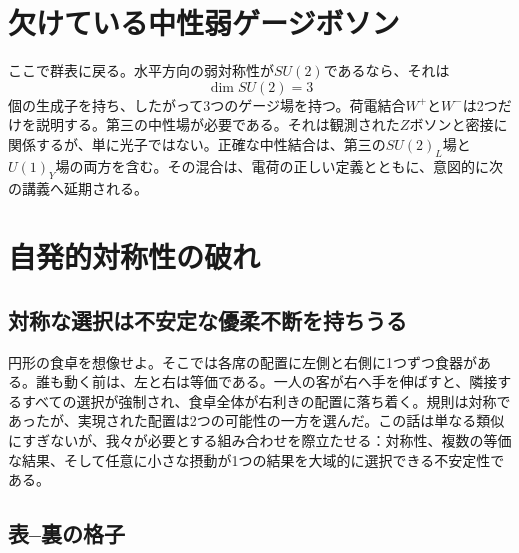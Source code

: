 \begin{classroomqa}
\end{classroomqa}

\section{欠けている中性弱ゲージボソン}

ここで群表に戻る。水平方向の弱対称性が\(SU(2)\)であるなら、それは
\begin{equation}
  \dim SU(2)=3
\end{equation}
個の生成子を持ち、したがって3つのゲージ場を持つ。荷電結合\(W^+\)と\(W^-\)は2つだけを説明する。第三の中性場が必要である。それは観測された\(Z\)ボソンと密接に関係するが、単に光子ではない。正確な中性結合は、第三の\(SU(2)_L\)場と\(U(1)_Y\)場の両方を含む。その混合は、電荷の正しい定義とともに、意図的に次の講義へ延期される。

\section{自発的対称性の破れ}

\subsection{対称な選択は不安定な優柔不断を持ちうる}

円形の食卓を想像せよ。そこでは各席の配置に左側と右側に1つずつ食器がある。誰も動く前は、左と右は等価である。一人の客が右へ手を伸ばすと、隣接するすべての選択が強制され、食卓全体が右利きの配置に落ち着く。規則は対称であったが、実現された配置は2つの可能性の一方を選んだ。この話は単なる類似にすぎないが、我々が必要とする組み合わせを際立たせる：対称性、複数の等価な結果、そして任意に小さな摂動が1つの結果を大域的に選択できる不安定性である。

\subsection{表--裏の格子}

